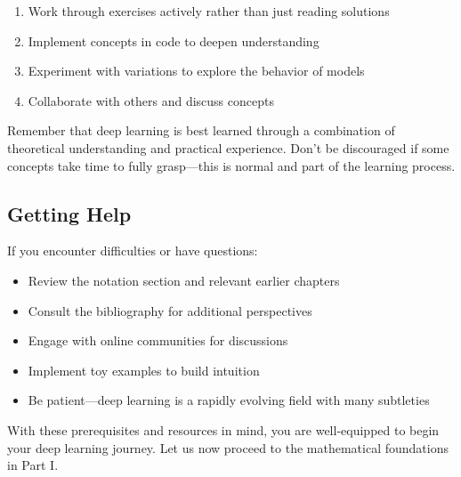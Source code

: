 \begin{enumerate}
    \item Work through exercises actively rather than just reading solutions
    \item Implement concepts in code to deepen understanding
    \item Experiment with variations to explore the behavior of models
    \item Collaborate with others and discuss concepts
\end{enumerate}

Remember that deep learning is best learned through a combination of theoretical understanding and practical experience. Don't be discouraged if some concepts take time to fully grasp---this is normal and part of the learning process.

\subsection{Getting Help}

If you encounter difficulties or have questions:
\begin{itemize}
    \item Review the notation section and relevant earlier chapters
    \item Consult the bibliography for additional perspectives
    \item Engage with online communities for discussions
    \item Implement toy examples to build intuition
    \item Be patient---deep learning is a rapidly evolving field with many subtleties
\end{itemize}

With these prerequisites and resources in mind, you are well-equipped to begin your deep learning journey. Let us now proceed to the mathematical foundations in Part I.
